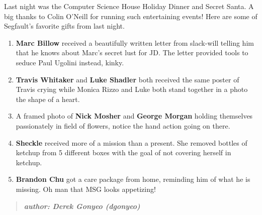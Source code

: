\documentclass[9pt]{extarticle} %
\begin{document}
%
%
\begin{minipage}[t]{.66\linewidth} %
\vspace{-0.4cm}


\hypertarget{firstnews}{} 

Last night was the Computer Science House Holiday Dinner and Secret Santa. A big
thanks to Colin O’Neill for running such entertaining events! Here are some of 
Segfault’s favorite gifts from last night. 

\begin{enumerate}
\item \textbf{Marc Billow} received a beautifully written letter from slack-will
telling him that he knows about Marc's secret lust for JD. The letter provided 
tools to seduce Paul Ugolini instead, kinky. 

\item \textbf{Travis Whitaker} and \textbf{Luke Shadler} both received the same 
poster of Travis crying while Monica Rizzo and Luke both stand together in a photo
the shape of a heart. 

\item A framed photo of \textbf{Nick Mosher} and \textbf{George Morgan} holding
themselves passionately in field of flowers, notice the hand action going on there.

\item \textbf{Sheckle} received more of a mission than a present. She removed 
bottles of ketchup from 5 different boxes with the goal of not covering herself
in ketchup.  

\item \textbf{Brandon Chu} got a care package from home, reminding him of what he
is missing. Oh man that MSG looks appetizing!

\end{enumerate}


\hypertarget{secondnews}{}
\begin{quote}
\centering
\textbf{\textit{author: Derek Gonyeo (dgonyeo)}}
\end{quote}
	

\end{minipage}
\end{document}
